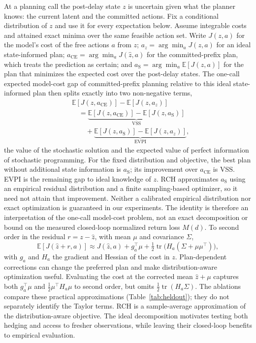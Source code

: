 \documentclass[aps,physrev,\manuscriptlayout,superscriptaddress,
  longbibliography,amsmath,amssymb]{revtex4-2}
\begin{document}
At a planning call the post-delay state $z$ is uncertain given what the planner knows: the current latent and the committed actions. Fix a conditional distribution of $z$ and use it for every expectation below. Assume integrable costs and attained exact minima over the same feasible action set. Write $J(z,a)$ for the model's cost of the free actions $a$ from $z$; $a_z=\arg\min_a J(z,a)$ for an ideal state-informed plan; $a_{\mathrm{CE}}=\arg\min_a J(\hat z,a)$ for the committed-prefix plan, which treats the prediction as certain; and $a_{\mathrm S}=\arg\min_a \mathbb{E}[J(z,a)]$ for the plan that minimizes the expected cost over the post-delay states. The one-call expected model-cost gap of committed-prefix planning relative to this ideal state-informed plan then splits exactly into two non-negative terms,
\begin{align}
&\mathbb{E}[J(z,a_{\mathrm{CE}})]-\mathbb{E}[J(z,a_z)] \nonumber\\
&\quad=\underbrace{\mathbb{E}[J(z,a_{\mathrm{CE}})]-\mathbb{E}[J(z,a_{\mathrm S})]}_{\text{VSS}} \nonumber\\
&\qquad+\underbrace{\mathbb{E}[J(z,a_{\mathrm S})]-\mathbb{E}[J(z,a_z)]}_{\text{EVPI}},
\end{align}
the value of the stochastic solution and the expected value of perfect information of stochastic programming\cite{birge2011stochastic}. For the fixed distribution and objective, the best plan without additional state information is $a_{\mathrm S}$; its improvement over $a_{\mathrm{CE}}$ is VSS. EVPI is the remaining gap to ideal knowledge of $z$. RCH approximates $a_{\mathrm S}$ using an empirical residual distribution and a finite sampling-based optimizer, so it need not attain that improvement. Neither a calibrated empirical distribution nor exact optimization is guaranteed in our experiments. The identity is therefore an interpretation of the one-call model-cost problem, not an exact decomposition or bound on the measured closed-loop normalized return loss $M(d)$. To second order in the residual $r=z-\hat z$, with mean $\mu$ and covariance $\Sigma$,
\begin{equation}
\mathbb{E}[J(\hat z+r,a)]\approx J(\hat z,a)+g_a^{\top}\mu+\tfrac12\operatorname{tr}\!\big(H_a(\Sigma+\mu\mu^{\top})\big),
\end{equation}
with $g_a$ and $H_a$ the gradient and Hessian of the cost in $z$. Plan-dependent corrections can change the preferred plan and make distribution-aware optimization useful. Evaluating the cost at the corrected mean $\hat z+\mu$ captures both $g_a^{\top}\mu$ and $\tfrac12\mu^{\top}H_a\mu$ to second order, but omits $\tfrac12\operatorname{tr}(H_a\Sigma)$. The ablations compare these practical approximations (Table~\ref{tab:heldout}); they do not separately identify the Taylor terms. RCH is a sample-average approximation of the distribution-aware objective. The ideal decomposition motivates testing both hedging and access to fresher observations, while leaving their closed-loop benefits to empirical evaluation.
\end{document}
